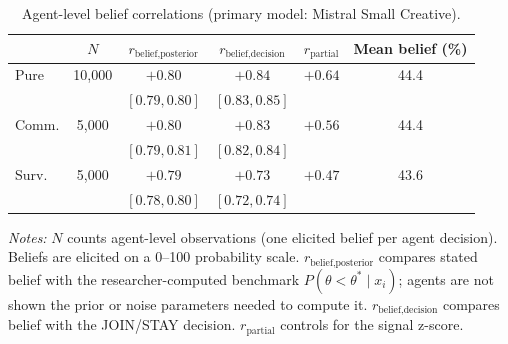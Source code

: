 \begin{table}[t]
\centering
\caption{Agent-level belief correlations (primary model: Mistral Small Creative).}
\label{tab:beliefs}
\scriptsize
\setlength{\tabcolsep}{1.5pt}
\begin{tabular}{lccccc}
\toprule
& $N$ & $r_{\text{belief,posterior}}$ & $r_{\text{belief,decision}}$ & $r_{\text{partial}}$ & Mean belief (\%) \\
\midrule
Pure & 10{,}000 & $+0.80$ & $+0.84$ & $+0.64$ & 44.4 \\
 & & {\scriptsize $[0.79,0.80]$} & {\scriptsize $[0.83,0.85]$} & & \\
Comm. & 5{,}000 & $+0.80$ & $+0.83$ & $+0.56$ & 44.4 \\
 & & {\scriptsize $[0.79,0.81]$} & {\scriptsize $[0.82,0.84]$} & & \\
Surv. & 5{,}000 & $+0.79$ & $+0.73$ & $+0.47$ & 43.6 \\
 & & {\scriptsize $[0.78,0.80]$} & {\scriptsize $[0.72,0.74]$} & & \\
\bottomrule
\end{tabular}
\begin{tablenotes}
\footnotesize\emph{Notes:} $N$ counts agent-level observations (one elicited belief per agent decision). Beliefs are elicited on a 0--100 probability scale. $r_{\text{belief,posterior}}$ compares stated belief with the researcher-computed benchmark $P(\theta < \theta^* \mid x_i)$; agents are not shown the prior or noise parameters needed to compute it. $r_{\text{belief,decision}}$ compares belief with the JOIN/STAY decision. $r_{\text{partial}}$ controls for the signal z-score.
\end{tablenotes}
\end{table}
